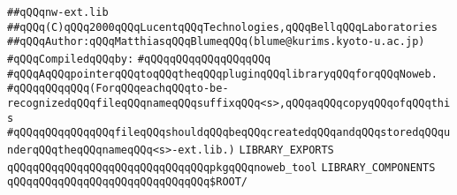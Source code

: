 \label{src/app/makelib/tools/noweb/nw-ext.lib}
\verb|##qQQqnw-ext.lib|\newline
\verb|##qQQq(C)qQQq2000qQQqLucentqQQqTechnologies,qQQqBellqQQqLaboratories|\newline
\verb|##qQQqAuthor:qQQqMatthiasqQQqBlumeqQQq(blume@kurims.kyoto-u.ac.jp)|\newline
\newline
\verb|#qQQqCompiledqQQqby:|\newline
\verb|#qQQqqQQqqQQqqQQqqQQq|\newline
\newline
\newline
\verb|#qQQqAqQQqpointerqQQqtoqQQqtheqQQqpluginqQQqlibraryqQQqforqQQqNoweb.|\newline
\verb|#qQQqqQQqqQQq(ForqQQqeachqQQqto-be-recognizedqQQqfileqQQqnameqQQqsuffixqQQq<s>,qQQqaqQQqcopyqQQqofqQQqthis|\newline
\verb|#qQQqqQQqqQQqqQQqfileqQQqshouldqQQqbeqQQqcreatedqQQqandqQQqstoredqQQqunderqQQqtheqQQqnameqQQq<s>-ext.lib.)|\newline
\newline
\newline
\newline
\newline
\verb|LIBRARY_EXPORTS|\newline
\newline
\verb|qQQqqQQqqQQqqQQqqQQqqQQqqQQqqQQqpkgqQQqnoweb_tool|\newline
\newline
\newline
\newline
\verb|LIBRARY_COMPONENTS|\newline
\newline
\verb|qQQqqQQqqQQqqQQqqQQqqQQqqQQqqQQq$ROOT/|\newline

